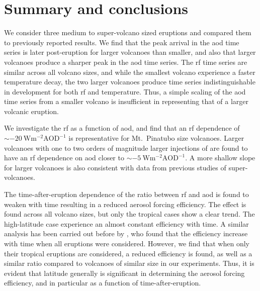 \documentclass{ametsocV6.1}
\begin{document}

\section{Summary and conclusions}\label{sec:conclusions}

We consider three medium to super-volcano sized eruptions and compared them to
previously reported results. We find that the peak arrival in the \gls{aod} time series
is later post-eruption for larger volcanoes than smaller, and also that larger volcanoes
produce a sharper peak in the \gls{aod} time series. The \gls{rf} time series are
similar across all volcano sizes, and while the smallest volcano experience a faster
temperature decay, the two larger volcanoes produce time series indistinguishable in
development for both \gls{rf} and temperature. Thus, a simple scaling of the \gls{aod}
time series from a smaller volcano is insufficient in representing that of a larger
volcanic eruption.

We investigate the \gls{rf} as a function of \gls{aod}, and find that an \gls{rf}
dependence of \(\sim\SI{-20}{\watt\metre^{-2}\mathrm{AOD}^{-1}}\) is representative for
Mt.\ Pinatubo size volcanoes. Larger volcanoes with one to two orders of magnitude
larger injections of  are found to have an \gls{rf} dependence on \gls{aod}
closer to \(\sim \SI{-5}{\watt\metre^{-2}\mathrm{AOD}^{-1}}\). A more shallow slope for
larger volcanoes is also consistent with data from previous studies of super-volcanoes.

The time-after-eruption dependence of the ratio between \gls{rf} and \gls{aod} is found
to weaken with time resulting in a reduced aerosol forcing efficiency. The effect is
found across all volcano sizes, but only the tropical cases show a clear trend. The
high-latitude case experience an almost constant efficiency with time. A similar
analysis has been carried out before by \citet{marshall2020}, who found that the
efficiency increase with time when all eruptions were considered. However, we find that
when only their tropical eruptions are considered, a reduced efficiency is found, as
well as a similar ratio compared to volcanoes of similar size in our experiments. Thus,
it is evident that latitude generally is significant in determining the aerosol forcing
efficiency, and in particular as a function of time-after-eruption.
\end{document}
